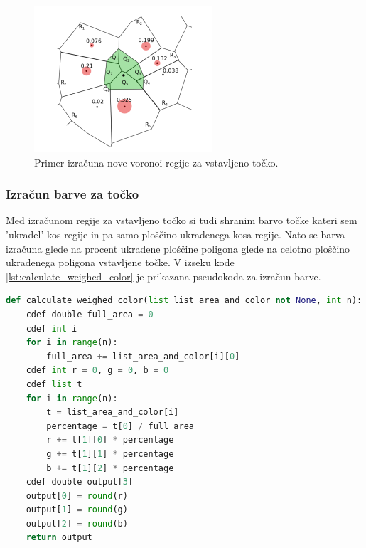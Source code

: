 \documentclass{egpubl}
\begin{document}
	\begin{figure}[!htb]
		\centering
		\parbox[t]{.7\columnwidth}{\relax
			\includegraphics[width=.95\linewidth]{insert_point.png}
		}
		\caption{\label{fig:insert_point}
			Primer izračuna nove voronoi regije za vstavljeno točko.}
	\end{figure}
	
	\subsubsection{Izračun barve za točko}
	Med izračunom regije za vstavljeno točko si tudi shranim barvo točke kateri sem 'ukradel' kos regije in pa samo ploščino ukradenega kosa regije.
	Nato se barva izračuna glede na procent ukradene ploščine poligona glede na celotno ploščino ukradenega poligona vstavljene točke. V izseku kode \ref{lst:calculate_weighed_color} je prikazana pseudokoda za izračun barve.
	
	\begin{lstlisting}[language=Python,basicstyle=\tiny, caption={Pseudokoda algoritma za izračun barve točke},captionpos=b,label={lst:calculate_weighed_color}]
def calculate_weighed_color(list list_area_and_color not None, int n):
	cdef double full_area = 0
	cdef int i
	for i in range(n):
		full_area += list_area_and_color[i][0]
	cdef int r = 0, g = 0, b = 0
	cdef list t
	for i in range(n):
		t = list_area_and_color[i]
		percentage = t[0] / full_area
		r += t[1][0] * percentage
		g += t[1][1] * percentage
		b += t[1][2] * percentage
	cdef double output[3]
	output[0] = round(r)
	output[1] = round(g)
	output[2] = round(b)
	return output
	\end{lstlisting}
	
\end{document}
